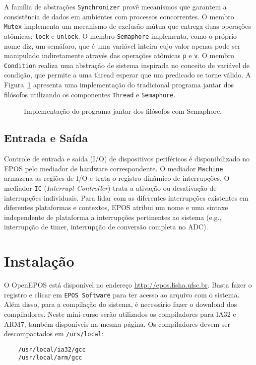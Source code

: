 \documentclass[11pt,twocolumn]{article}
\newcommand{\prg}[3][ht!]{
  \begin{figure}[#1]
      
    \caption{#3\label{prg:#2}}
  \end{figure}
}
\begin{document}
A família de abstrações \texttt{Synchronizer} provê mecanismos que garantem a consistência de dados em ambientes com processos concorrentes. O membro \texttt{Mutex} implementa um mecanismo de exclusão mútua que entrega duas operações atômicas: \texttt{lock} e \texttt{unlock}. O membro \texttt{Semaphore} implementa, como o próprio nome diz, um semáforo, que é uma variável inteira cujo valor apenas pode ser manipulado indiretamente através das operações atômicas \texttt{p} e \texttt{v}. O membro \texttt{Condition} realiza uma abstração de sistema inspirada no conceito de variável de condição, que permite a uma thread esperar que um predicado se torne válido. A Figura~\ref{prg:semaphore} apresenta uma implementação do tradicional programa jantar dos filósofos utilizando os componentes \texttt{Thread} e \texttt{Semaphore}.

\prg{semaphore}{Implementação do programa jantar dos filósofos com Semaphore.}

\subsection{Entrada e Saída}

Controle de entrada e saída (I/O) de dispositivos periféricos é disponibilizado no \textsc{EPOS} pelo mediador de hardware correspondente. O mediador \texttt{Machine} armazena as regiões de I/O e trata o registro dinâmico de interrupções. O mediador \texttt{IC} (\textit{Interrupt Controller}) trata a ativação ou desativação de interrupções individuais. Para lidar com as diferentes interrupções existentes em diferentes plataformas e contextos, \textsc{EPOS} atribui um nome e uma sintaxe independente de plataforma a interrupções pertinentes ao sistema (e.g., interrupção de timer, interrupção de conversão completa no ADC).

\section{Instalação}

O OpenEPOS está disponível no endereço \url{http://epos.lisha.ufsc.br}. Basta fazer o registro e clicar em \texttt{EPOS Software} para ter acesso ao arquivo com o sistema. Além disso, para a compilação do sistema, é necessário fazer o download dos compiladores. Neste mini-curso serão utilizados os compiladores para IA32 e ARM7, também disponíveis na mesma página. Os compiladores devem ser descompactados em \texttt{/urs/local}:

\begin{verbatim}
	/usr/local/ia32/gcc
	/usr/local/arm/gcc
\end{verbatim}
\end{document}
